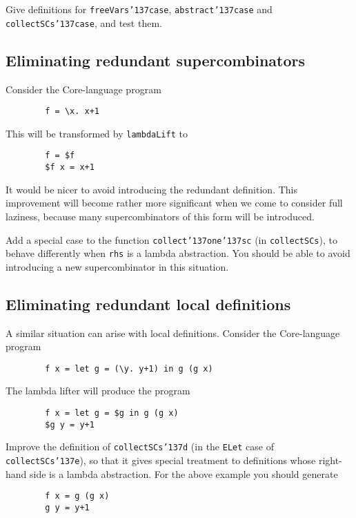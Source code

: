 \begin{exercise} \label{ex:simple-lambdalift-case}
Give definitions for \mbox{\tt freeVars{\char'137}case}, \mbox{\tt abstract{\char'137}case} and \mbox{\tt collectSCs{\char'137}case},
and test them.
\end{exercise}

\subsection{Eliminating redundant supercombinators}

Consider the Core-language program
\begin{verbatim}
        f = \x. x+1
\end{verbatim}
This will be transformed by \mbox{\tt lambdaLift} to
\begin{verbatim}
        f = $f
        $f x = x+1
\end{verbatim}
It would be nicer to avoid introducing the redundant definition.
This improvement will become rather more significant when we come to
consider full laziness, because many supercombinators of this form
will be introduced.
\begin{exercise}
Add a special case to the function \mbox{\tt collect{\char'137}one{\char'137}sc} (in \mbox{\tt collectSCs}),
to behave differently when \mbox{\tt rhs} is a lambda abstraction.
You should be able to avoid introducing a new supercombinator
in this situation.
\end{exercise}

\subsection{Eliminating redundant local definitions}

A similar situation can arise with local definitions.
Consider the Core-language program
\begin{verbatim}
        f x = let g = (\y. y+1) in g (g x)
\end{verbatim}
The lambda lifter will produce the program
\begin{verbatim}
        f x = let g = $g in g (g x)
        $g y = y+1
\end{verbatim}
\begin{exercise}
Improve the definition of \mbox{\tt collectSCs{\char'137}d} (in the \mbox{\tt ELet} case of \mbox{\tt collectSCs{\char'137}e}),
so that it gives special treatment to definitions
whose right-hand side is a lambda abstraction.  For the above example you
should generate
\begin{verbatim}
        f x = g (g x)
        g y = y+1
\end{verbatim}
\end{exercise}


